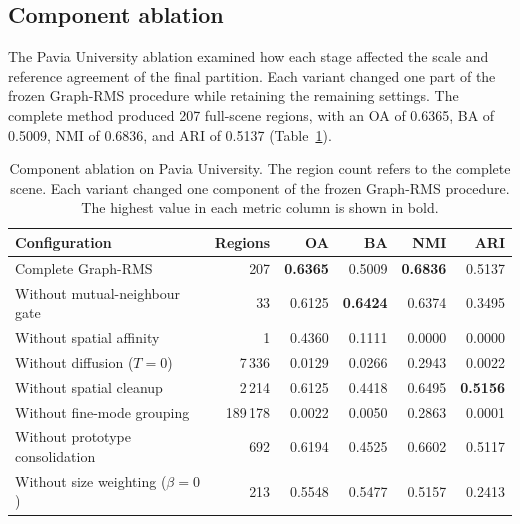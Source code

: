 \documentclass[10pt,a4paper,fleqn]{article}
\begin{document}
\subsection{Component ablation}
\label{subsec:ablation_results}

The Pavia University ablation examined how each stage affected the scale and
reference agreement of the final partition. Each variant changed one part of
the frozen Graph-RMS procedure while retaining the remaining settings. The
complete method produced 207 full-scene regions, with an OA of 0.6365, BA of
0.5009, NMI of 0.6836, and ARI of 0.5137
(Table~\ref{tab:ablation}).

\begin{table}[!t]
\centering
\footnotesize
\caption{Component ablation on Pavia University. The region count refers to
the complete scene. Each variant changed one component of the frozen
Graph-RMS procedure. The highest value in each metric column is shown in
bold.}
\label{tab:ablation}

\renewcommand{\arraystretch}{1.05}
\setlength{\tabcolsep}{4.2pt}

\begin{tabularx}{\textwidth}{@{}Xrrrrr@{}}
\toprule
Configuration & Regions & OA & BA & NMI & ARI \\
\midrule
Complete Graph-RMS
& 207
& \textbf{0.6365}
& 0.5009
& \textbf{0.6836}
& 0.5137 \\

Without mutual-neighbour gate
& 33
& 0.6125
& \textbf{0.6424}
& 0.6374
& 0.3495 \\

Without spatial affinity
& 1
& 0.4360
& 0.1111
& 0.0000
& 0.0000 \\

Without diffusion (\(T=0\))
& 7\,336
& 0.0129
& 0.0266
& 0.2943
& 0.0022 \\

Without spatial cleanup
& 2\,214
& 0.6125
& 0.4418
& 0.6495
& \textbf{0.5156} \\

Without fine-mode grouping
& 189\,178
& 0.0022
& 0.0050
& 0.2863
& 0.0001 \\

Without prototype consolidation
& 692
& 0.6194
& 0.4525
& 0.6602
& 0.5117 \\

Without size weighting (\(\beta=0\))
& 213
& 0.5548
& 0.5477
& 0.5157
& 0.2413 \\
\bottomrule
\end{tabularx}
\end{table}
\end{document}
